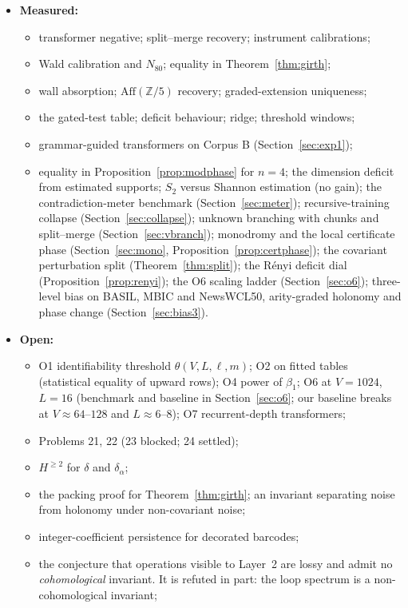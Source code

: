 \documentclass[11pt]{article}
\theoremstyle{definition}
\theoremstyle{remark}
\newcommand{\Z}{\mathbb{Z}}
\newcommand{\Aff}{\mathrm{Aff}}
\begin{document}
\begin{itemize}
\begin{itemize}
  \end{itemize}
  \item \textbf{Measured:}
  \begin{itemize}
    \item transformer negative; split--merge recovery; instrument calibrations;
    \item Wald calibration and $N_{80}$; equality in Theorem~\ref{thm:girth};
    \item wall absorption; $\Aff(\Z/5)$ recovery; graded-extension uniqueness;
    \item the gated-test table; deficit behaviour; ridge; threshold windows;
    \item grammar-guided transformers on Corpus B (Section~\ref{sec:exp1});
    \item equality in Proposition~\ref{prop:modphase} for $n=4$; the dimension deficit from estimated supports; $S_2$ versus Shannon estimation (no gain); the contradiction-meter benchmark (Section~\ref{sec:meter}); recursive-training collapse (Section~\ref{sec:collapse}); unknown branching with chunks and split--merge (Section~\ref{sec:vbranch}); monodromy and the local certificate phase (Section~\ref{sec:mono}, Proposition~\ref{prop:certphase}); the covariant perturbation split (Theorem~\ref{thm:split}); the R\'enyi deficit dial (Proposition~\ref{prop:renyi}); the O6 scaling ladder (Section~\ref{sec:o6}); three-level bias on BASIL, MBIC and NewsWCL50, arity-graded holonomy and phase change (Section~\ref{sec:bias3}).
  \end{itemize}
  \item \textbf{Open:}
  \begin{itemize}
    \item O1 identifiability threshold $\theta(V,L,\ell,m)$; O2 on fitted tables (statistical equality of upward rows); O4 power of $\beta_1$; O6 at $V=1024$, $L=16$ (benchmark and baseline in Section~\ref{sec:o6}; our baseline breaks at $V\approx64$--$128$ and $L\approx6$--$8$); O7 recurrent-depth transformers;
    \item Problems 21, 22 (23 blocked; 24 settled);
    \item $H^{\ge2}$ for $\delta$ and $\delta_\alpha$;
    \item the packing proof for Theorem~\ref{thm:girth}; an invariant separating noise from holonomy under non-covariant noise;
    \item integer-coefficient persistence for decorated barcodes;
    \item the conjecture that operations visible to Layer~2 are lossy and admit no \emph{cohomological} invariant. It is refuted in part: the loop spectrum is a non-cohomological invariant;

\end{itemize}
\end{itemize}
\end{document}
